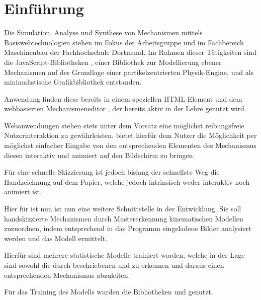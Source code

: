 \section{Einführung}
Die Simulation, Analyse und Synthese von Mechanismen mittels Basiswebtechnologien stehen im Fokus der Arbeitsgruppe  und  im Fachbereich Maschinenbau der Fachhochschule Dortmund.
Im Rahmen dieser Tätigkeiten sind die JavaScript-Bibliotheken \cite{Goessner2019}\cite{Goessner2019a}\cite{Goessner2018}, einer Bibliothek zur Modellierung ebener Mechanismen auf der Grundlage einer partikelzentrierten Physik-Engine, und \cite{Goessner2019b} als minimalistische Grafikbibliothek entstanden. 

Anwendung finden diese bereits in einem speziellen  HTML-Element und dem webbasierten Mechanismeneditor \cite{Uhlig2019}\cite{Uhlig2019a}, der bereits aktiv in der Lehre genutzt wird.

Webanwendungen stehen stets unter dem Vorsatz eine möglichst reibungsfreie Nutzerinteraktion zu gewährleisten.
 bietet hierfür dem Nutzer die Möglichkeit per möglichst einfacher Eingabe von den entsprechenden Elementen des Mechanismus diesen interaktiv und animiert auf den Bildschirm zu bringen.

Für eine schnelle Skizzierung ist jedoch bislang der schnellste Weg die Handzeichnung auf dem Papier, welche jedoch intrinsisch weder interaktiv noch animiert ist.

Hier für ist nun ist nun eine weitere Schnittstelle in der Entwicklung.
Sie soll handskizzierte Mechanismen durch Mustererkennung kinematischen Modellen zuzuordnen, indem entsprechend in das Programm eingeladene Bilder analysiert werden und das  Modell ermittelt.

Hierfür sind mehrere statistische Modelle trainiert worden, welche in der Lage sind sowohl die durch  beschriebenen  und  zu erkennen und daraus einen entsprechenden Mechanismus abzuleiten.

Für das Training des Modells wurden die Bibliotheken \cite{Google2019} und \cite{Chollet2019}\cite{Chollet2017} genutzt.
